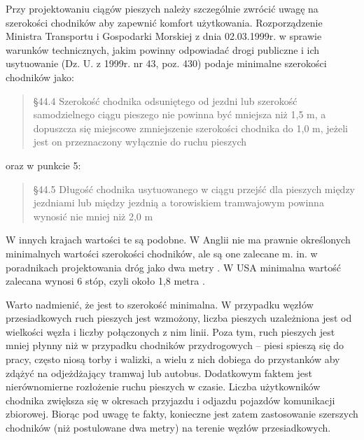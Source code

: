 \documentclass[twoside,12pt]{article}
\begin{document}
	\begin{samepage}Przy projektowaniu ciągów pieszych należy szczególnie zwrócić uwagę na szerokości chodników aby zapewnić komfort użytkowania. Rozporządzenie Ministra Transportu i Gospodarki Morskiej z dnia 02.03.1999r. w sprawie warunków technicznych, jakim powinny odpowiadać drogi publiczne i ich usytuowanie (Dz. U. z 1999r. nr 43, poz. 430)  podaje minimalne szerokości chodników jako: 
	\begin{quote}
	§44.4 Szerokość chodnika odsuniętego od jezdni lub szerokość samodzielnego ciągu pieszego nie powinna być mniejsza niż 1,5 m, a dopuszcza się miejscowe zmniejszenie szerokości chodnika do 1,0 m, jeżeli jest on przeznaczony wyłącznie do ruchu pieszych \cite{rozporzadzenie_drogi}
\end{quote}
	 oraz w punkcie 5: 
\begin{quote}
	 §44.5 Długość chodnika usytuowanego w ciągu przejść dla pieszych między jezdniami lub między jezdnią a torowiskiem tramwajowym powinna wynosić nie mniej niż 2,0 m \cite{rozporzadzenie_drogi}
	 \end{quote}\end{samepage}
	 
	 W innych krajach wartości te są podobne. W Anglii nie ma prawnie określonych minimalnych wartości szerokości chodników, ale są one zalecane m. in. w poradnikach projektowania dróg jako dwa metry \cite{young}. W USA minimalna wartość zalecana wynosi 6 stóp, czyli około 1,8 metra \cite{guidelines_washington}. 
	 
	 Warto nadmienić, że jest to szerokość minimalna. W przypadku węzłów przesiadkowych ruch pieszych jest wzmożony, liczba pieszych uzależniona jest od wielkości węzła i liczby połączonych z nim linii. Poza tym, ruch pieszych jest mniej płynny niż w przypadku chodników przydrogowych -- piesi spieszą się do pracy, często niosą torby i walizki, a wielu z nich dobiega do przystanków aby zdążyć na odjeżdżający tramwaj lub autobus. Dodatkowym faktem jest nierównomierne rozłożenie ruchu pieszych w czasie. Liczba użytkowników chodnika zwiększa się w okresach przyjazdu i odjazdu pojazdów komunikacji zbiorowej. Biorąc pod uwagę te fakty, konieczne jest zatem zastosowanie szerszych chodników (niż postulowane dwa metry) na terenie węzłów przesiadkowych. 
	 
\end{document}
